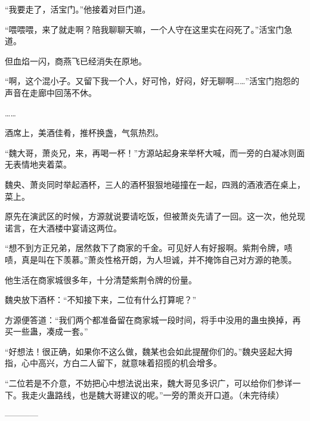 \begin{this_body}
“我要走了，活宝门。”他接着对巨门道。

“喂喂喂，来了就走啊？陪我聊聊天嘛，一个人守在这里实在闷死了。”活宝门急道。

但血焰一闪，商燕飞已经消失在原地。

“啊，这个混小子。又留下我一个人，好可怜，好闷，好无聊啊……”活宝门抱怨的声音在走廊中回荡不休。

……

酒席上，美酒佳肴，推杯换盏，气氛热烈。

“魏大哥，萧炎兄，来，再喝一杯！”方源站起身来举杯大喊，而一旁的白凝冰则面无表情地夹着菜。

魏央、萧炎同时举起酒杯，三人的酒杯狠狠地碰撞在一起，四溅的酒液洒在桌上，菜上。

原先在演武区的时候，方源就说要请吃饭，但被萧炎先请了一回。这一次，他兑现诺言，在大酒楼中宴请这两位。

“想不到方正兄弟，居然救下了商家的千金。可见好人有好报啊。紫荆令牌，啧啧，真是叫在下羡慕。”萧炎性格开朗，为人坦诚，并不掩饰自己对方源的艳羡。

他生活在商家城很多年，十分清楚紫荆令牌的份量。

魏央放下酒杯：“不知接下来，二位有什么打算呢？”

方源便答道：“我们两个都准备留在商家城一段时间，将手中没用的蛊虫换掉，再买一些蛊，凑成一套。”

“好想法！很正确，如果你不这么做，魏某也会如此提醒你们的。”魏央竖起大拇指，心中高兴，方白二人留下，就意味着招揽的机会增多。

“二位若是不介意，不妨把心中想法说出来，魏大哥见多识广，可以给你们参详一下。我走火蛊路线，也是魏大哥建议的呢。”一旁的萧炎开口道。（未完待续）

------------

\end{this_body}


